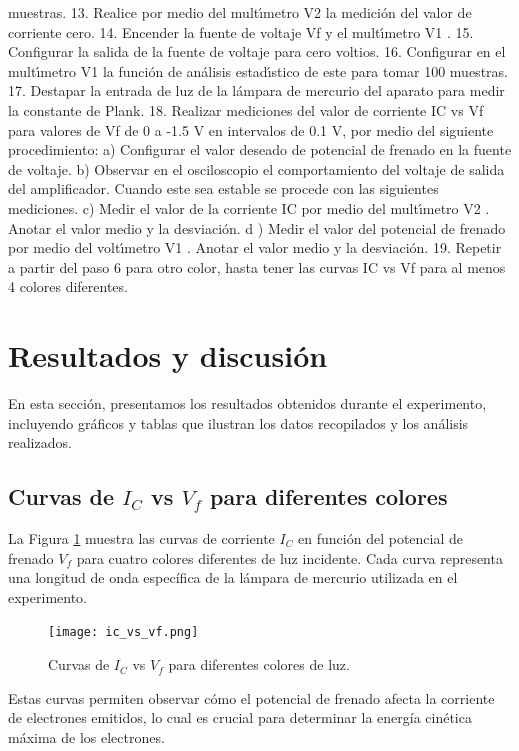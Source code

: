 \documentclass[twocolumn,a4paper,11pt]{scrartcl}
\begin{document}
muestras.
13. Realice por medio del multı́metro V2 la medición del valor de corriente cero.
14. Encender la fuente de voltaje Vf y el multı́metro V1 .
15. Configurar la salida de la fuente de voltaje para cero voltios.
16. Configurar en el multı́metro V1 la función de análisis estadı́stico de este para tomar 100
muestras.
17. Destapar la entrada de luz de la lámpara de mercurio del aparato para medir la constante de
Plank.
18. Realizar mediciones del valor de corriente IC vs Vf para valores de Vf de 0 a -1.5 V en
intervalos de 0.1 V, por medio del siguiente procedimiento:
a) Configurar el valor deseado de potencial de frenado en la fuente de voltaje.
b) Observar en el osciloscopio el comportamiento del voltaje de salida del amplificador.
Cuando este sea estable se procede con las siguientes mediciones.
c) Medir el valor de la corriente IC por medio del multı́metro V2 . Anotar el valor medio y
la desviación.
d ) Medir el valor del potencial de frenado por medio del voltı́metro V1 . Anotar el valor
medio y la desviación.
19. Repetir a partir del paso 6 para otro color, hasta tener las curvas IC vs Vf para al menos 4
colores diferentes.


\section{Resultados y discusión}

En esta sección, presentamos los resultados obtenidos durante el experimento, incluyendo gráficos y tablas que ilustran los datos recopilados y los análisis realizados.

\subsection{Curvas de $I_C$ vs $V_f$ para diferentes colores}

La Figura \ref{fig:ic_vs_vf} muestra las curvas de corriente $I_C$ en función del potencial de frenado $V_f$ para cuatro colores diferentes de luz incidente. Cada curva representa una longitud de onda específica de la lámpara de mercurio utilizada en el experimento.

\begin{figure}[h]
    \centering
    \texttt{[image: ic\_vs\_vf.png]}
    \caption{Curvas de $I_C$ vs $V_f$ para diferentes colores de luz.}
    \label{fig:ic_vs_vf}
\end{figure}

Estas curvas permiten observar cómo el potencial de frenado afecta la corriente de electrones emitidos, lo cual es crucial para determinar la energía cinética máxima de los electrones.
\end{document}
